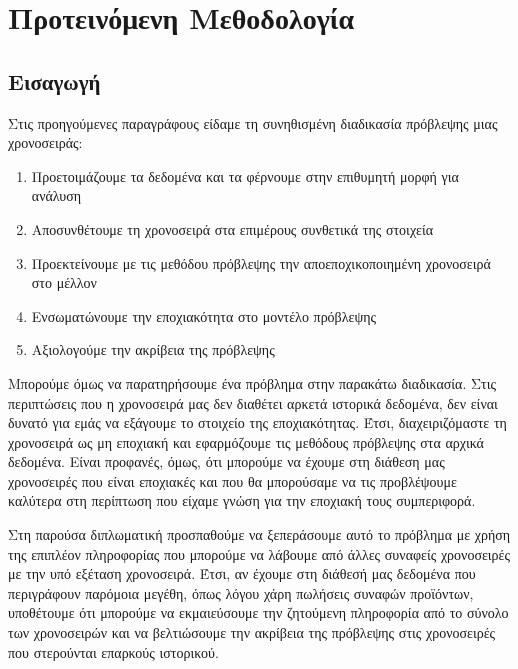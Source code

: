 \chapter{Προτεινόμενη Μεθοδολογία}
\label{chap4}

\section{Εισαγωγή}

Στις προηγούμενες παραγράφους είδαμε τη συνηθισμένη διαδικασία πρόβλεψης μιας χρονοσειράς:

\begin{enumerate}
\item Προετοιμάζουμε τα δεδομένα και τα φέρνουμε στην επιθυμητή μορφή για ανάλυση
\item Αποσυνθέτουμε τη χρονοσειρά στα επιμέρους συνθετικά της στοιχεία
\item Προεκτείνουμε με τις μεθόδου πρόβλεψης την αποεποχικοποιημένη χρονοσειρά στο μέλλον
\item Ενσωματώνουμε την εποχιακότητα στο μοντέλο πρόβλεψης
\item Αξιολογούμε την ακρίβεια της πρόβλεψης
\end{enumerate}

Μπορούμε όμως να παρατηρήσουμε ένα πρόβλημα στην παρακάτω διαδικασία. Στις περιπτώσεις που η χρονοσειρά μας δεν διαθέτει αρκετά ιστορικά δεδομένα, δεν είναι δυνατό για εμάς να εξάγουμε το στοιχείο της εποχιακότητας. Έτσι, διαχειριζόμαστε τη χρονοσειρά ως μη εποχιακή και εφαρμόζουμε τις μεθόδους πρόβλεψης στα αρχικά δεδομένα.  Είναι προφανές, όμως, ότι μπορούμε να έχουμε στη διάθεση μας χρονοσειρές που είναι εποχιακές και που θα μπορούσαμε να τις προβλέψουμε καλύτερα στη περίπτωση που είχαμε γνώση για την εποχιακή τους συμπεριφορά. 

Στη παρούσα διπλωματική προσπαθούμε να ξεπεράσουμε αυτό το πρόβλημα με χρήση της επιπλέον πληροφορίας που μπορούμε να λάβουμε από άλλες συναφείς χρονοσειρές με την υπό εξέταση χρονοσειρά. Έτσι, αν έχουμε στη διάθεσή μας δεδομένα που περιγράφουν παρόμοια μεγέθη, όπως λόγου χάρη πωλήσεις συναφών προϊόντων, υποθέτουμε ότι μπορούμε να εκμαιεύσουμε την ζητούμενη πληροφορία από το σύνολο των χρονοσειρών και να βελτιώσουμε την ακρίβεια της πρόβλεψης στις χρονοσειρές που στερούνται επαρκούς ιστορικού. 

